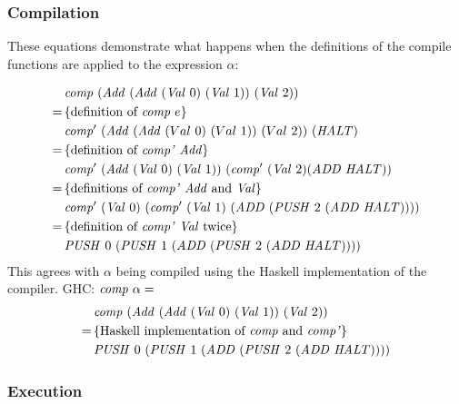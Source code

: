 \documentclass {article}
\begin{document}
\subsubsection{Compilation}

These equations demonstrate what happens
when the definitions of the compile functions are applied to
the expression $\alpha$:

\begin{align*}
&\Comp (\Add (\Add (\Val 0)\ (\Val 1))\ (\Val 2)) \\
=\, & \{ \mbox{definition of \comp\ $e$} \} \\
&\Compp  (\Add (\Add  (Val\ 0)\
			(Val\ 1))\ (Val\ 2))\ 			(\HALT) \\
=\, & \{ \mbox{definition of \compp\ \add} \} \\
&\Compp  (\Add (\Val 0)\ (\Val 1))\ (\Compp  (\Val 2) 	  (\ADD  \HALT)) \\
=\, & \{ \mbox{definitions of \compp\
		 \add\ and \val} \} \\
&\Compp  (\Val 0)\ (\Compp  (\Val 1)\
				(\ADD  (\PUSH 2\ (\ADD  \HALT)))) \\
=\, & \{ \mbox{definition of \compp\ \val\ twice} \} \\
&					 \PUSH 0\ (\PUSH 1\ (\ADD  (\PUSH 2\ (\ADD  \HALT)))) \\
\end{align*}
This agrees with $\alpha$ being compiled
using the Haskell implementation of the compiler.
GHC: \( \mathit{comp\ } \alpha =\)
\begin{align*}
&\mathit{comp\ } (\mathit{Add\ } (\mathit{Add\ } (\mathit{Val\ } 0)\ (\mathit{Val\ } 1))\ (\mathit{Val\ } 2)) \\
=\, & \{ \mbox{Haskell implementation of \textit{comp}\ and \textit{comp'}} \} \\
&\mathit{PUSH\ } 0\ (\mathit{PUSH\ } 1\ (\mathit{ADD\ }  (\mathit{PUSH\ } 2\ (\mathit{ADD\ } \mathit{HALT})))) 
\end{align*}

\subsubsection{Execution}
\end{document}
